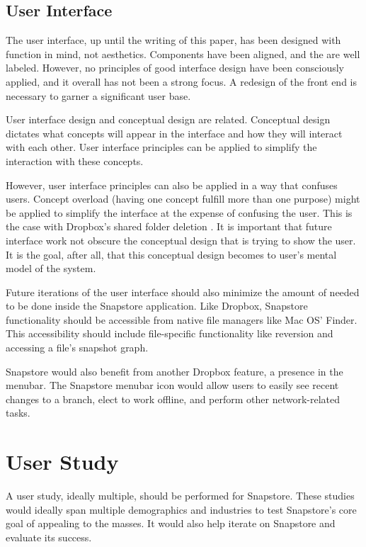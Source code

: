 \subsection{User Interface}

The user interface, up until the writing of this paper, has been designed with function in mind, not aesthetics. Components have been aligned, and the are well labeled. However, no principles of good interface design have been consciously applied, and it overall has not been a strong focus. A redesign of the front end is necessary to garner a significant user base.

User interface design and conceptual design are related. Conceptual design dictates what concepts will appear in the interface and how they will interact with each other. User interface principles can be applied to simplify the interaction with these concepts. 

However, user interface principles can also be applied in a way that confuses users. Concept overload (having one concept fulfill more than one purpose) might be applied to simplify the interface at the expense of confusing the user. This is the case with Dropbox's shared folder deletion \cite{Zhang}. It is important that future interface work not obscure the conceptual design that is trying to show the user. It is the goal, after all, that this conceptual design becomes to user's mental model of the system.

Future iterations of the user interface should also minimize the amount of needed to be done inside the Snapstore application. Like Dropbox, Snapstore functionality should be accessible from native file managers like Mac OS' Finder. This accessibility should include file-specific functionality like reversion and accessing a file's snapshot graph.

Snapstore would also benefit from another Dropbox feature, a presence in the menubar. The Snapstore menubar icon would allow users to easily see recent changes to a branch, elect to work offline, and perform other network-related tasks.

\section{User Study}

A user study, ideally multiple, should be performed for Snapstore. These studies would ideally span multiple demographics and industries to test Snapstore's core goal of appealing to the masses. It would also help iterate on Snapstore and evaluate its success.

